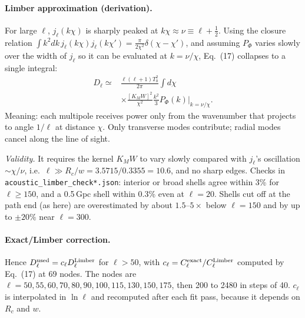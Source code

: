 \documentclass[10pt,twocolumn]{article}
\newcommand{\why}[1]{\par\noindent\textit{Validity.} #1\par}
\begin{document}
\paragraph{Limber approximation (derivation).} For large $\ell$, $j_\ell(k\chi)$ is sharply peaked at $k\chi\approx\nu\equiv\ell+\tfrac12$. Using the closure relation $\int k^2dk\,j_\ell(k\chi)j_\ell(k\chi')=\frac{\pi}{2\chi^2}\delta(\chi-\chi')$, and assuming $P_\Phi$ varies slowly over the width of $j_\ell$ so it can be evaluated at $k=\nu/\chi$, Eq.~(17) collapses to a single integral:
\begin{equation}\begin{split}
D_\ell\simeq&\frac{\ell(\ell+1)T_0^2}{2\pi}\int d\chi\\
&\times\frac{[K_MW]^2}{\chi^2}\frac{k^2}{3}P_\Phi(k)\Big|_{k=\nu/\chi}.
\end{split}\end{equation}
Meaning: each multipole receives power only from the wavenumber that projects to angle $1/\ell$ at distance $\chi$. Only transverse modes contribute; radial modes cancel along the line of sight.
\why{It requires the kernel $K_MW$ to vary slowly compared with $j_\ell$'s oscillation $\sim\chi/\nu$, i.e.\ $\ell\gg R_c/w=3.5715/0.3355=10.6$, and no sharp edges. Checks in \texttt{acoustic\_limber\_check*.json}: interior or broad shells agree within 3\% for $\ell\ge150$, and a 0.5\,Gpc shell within 0.3\% even at $\ell=20$. Shells cut off at the path end (as here) are overestimated by about $1.5$--$5\times$ below $\ell=150$ and by up to $\pm20\%$ near $\ell=300$.}

\paragraph{Exact/Limber correction.} Hence $D^{\rm used}_\ell=c_\ell D^{\rm Limber}_\ell$ for $\ell>50$, with $c_\ell=C^{\rm exact}_\ell/C^{\rm Limber}_\ell$ computed by Eq.~(17) at 69 nodes. The nodes are $\ell=50,55,60,70,80,90,100,115,130,150,175$, then 200 to 2480 in steps of 40. $c_\ell$ is interpolated in $\ln\ell$ and recomputed after each fit pass, because it depends on $R_c$ and $w$.
\end{document}
